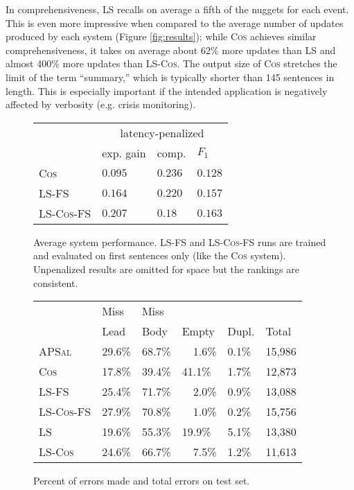  
  In comprehensiveness, \textsc{LS} recalls on average a fifth of the nuggets
 for each event. This is even more impressive when  compared to the average
 number of updates produced by each system (Figure \ref{fig:results}); while
 \textsc{Cos} achieves similar comprehensiveness, it takes on average about
 62\% more updates than \textsc{LS} and almost 400\% more updates than
 \textsc{LS-Cos}. The output size of \textsc{Cos} stretches the limit of the
 term ``summary,'' which is typically shorter than 145 sentences in length.
 This is especially important if the intended application is negatively
 affected by verbosity (e.g. crisis monitoring).




\begin{figure}
  \center
  \begin{tabular}{ l | l l l |}
    &\multicolumn{3}{c}{latency-penalized}\\
    & exp. gain     & comp. & $F_1$ \\
    \hline
    \small \textsc{Cos}  & $0.095$ & $\mathbf{0.236}$ & $0.128$ \\
    \small \textsc{LS-FS}  & $0.164$ & $0.220$ & $0.157$ \\
    \small \textsc{LS-Cos-FS} & 
      $\mathbf{0.207}$ & $0.18~~$ & $\mathbf{0.163}$ \\
  \end{tabular}
  \caption{Average system performance. \textsc{LS-FS} and \textsc{LS-Cos-FS} 
           runs are trained and evaluated on first sentences only (like the 
           \textsc{Cos} system). Unpenalized results are omitted for space but
           the rankings are consistent.}
  \label{fig:results-trunc}
\end{figure}

\begin{figure}
  \center
  \begin{tabular}{l|l|l|l|l|l}
    & Miss  &      Miss  &          &    &  \\
    & Lead &      Body &         Empty &   Dupl. & Total \\
    \hline
    \small \textsc{APSal}         
      & 29.6\% & 68.7\% & ~~1.6\% & 0.1\% & 15,986\\
    \small \textsc{Cos}     
      & 17.8\% & 39.4\% & 41.1\% & 1.7\% & 12,873\\
    \small \textsc{LS-FS}      
      & 25.4\% & 71.7\% & ~~2.0\% & 0.9\% & 13,088\\
    \small \textsc{LS-Cos-FS}
      & 27.9\% & 70.8\% & ~~1.0\% & 0.2\% & 15,756\\
    \small \textsc{LS}           
      & 19.6\% & 55.3\% & 19.9\% & 5.1\% & 13,380\\
    \small \textsc{LS-Cos}    
      & 24.6\% & 66.7\% & ~~7.5\% & 1.2\% & 11,613\\
  \end{tabular}
  \caption{Percent of errors made and total errors on test set.}
  \label{fig:errors}
\end{figure}

